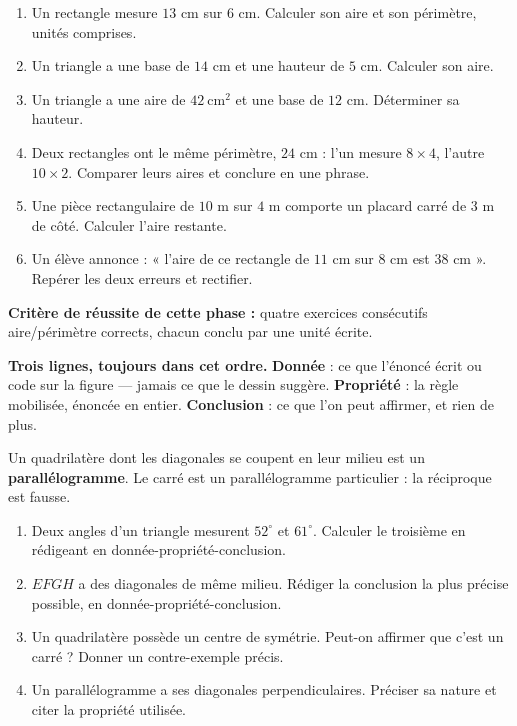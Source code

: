 \documentclass[10pt,a4paper]{article}
\begin{document}
\begin{enumerate}
\needspace{18mm}
\item Un rectangle mesure $13$ cm sur $6$ cm. Calculer son aire et son périmètre, unités comprises.
\needspace{18mm}
\item Un triangle a une base de $14$ cm et une hauteur de $5$ cm. Calculer son aire.
\needspace{18mm}
\item Un triangle a une aire de $42\ \text{cm}^2$ et une base de $12$ cm. Déterminer sa hauteur.
\needspace{18mm}
\item Deux rectangles ont le même périmètre, $24$ cm : l'un mesure $8\times 4$, l'autre $10\times 2$. Comparer leurs aires et conclure en une phrase.
\needspace{18mm}
\item Une pièce rectangulaire de $10$ m sur $4$ m comporte un placard carré de $3$ m de côté. Calculer l'aire restante.
\needspace{18mm}
\item Un élève annonce : « l'aire de ce rectangle de $11$ cm sur $8$ cm est $38$ cm ». Repérer les deux erreurs et rectifier.
\end{enumerate}
\begin{successbox}\textbf{Critère de réussite de cette phase :} quatre exercices consécutifs aire/périmètre corrects, chacun conclu par une unité écrite.\end{successbox}
\certline
\needspace{62mm}\par\vspace{3mm}
\begin{methodbox}
\textbf{Trois lignes, toujours dans cet ordre.}
\textbf{Donnée} : ce que l'énoncé écrit ou code sur la figure — jamais ce que le dessin suggère.
\textbf{Propriété} : la règle mobilisée, énoncée en entier.
\textbf{Conclusion} : ce que l'on peut affirmer, et rien de plus.
\par\smallskip
Un quadrilatère dont les diagonales se coupent en leur milieu est un \textbf{parallélogramme}.
Le carré est un parallélogramme particulier : la réciproque est fausse.
\end{methodbox}
\begin{enumerate}
\needspace{18mm}
\item Deux angles d'un triangle mesurent $52^\circ$ et $61^\circ$. Calculer le troisième en rédigeant en donnée-propriété-conclusion.
\needspace{18mm}
\item $EFGH$ a des diagonales de même milieu. Rédiger la conclusion la plus précise possible, en donnée-propriété-conclusion.
\needspace{18mm}
\item Un quadrilatère possède un centre de symétrie. Peut-on affirmer que c'est un carré ? Donner un contre-exemple précis.
\needspace{18mm}
\item Un parallélogramme a ses diagonales perpendiculaires. Préciser sa nature et citer la propriété utilisée.
\end{enumerate}
\end{document}

